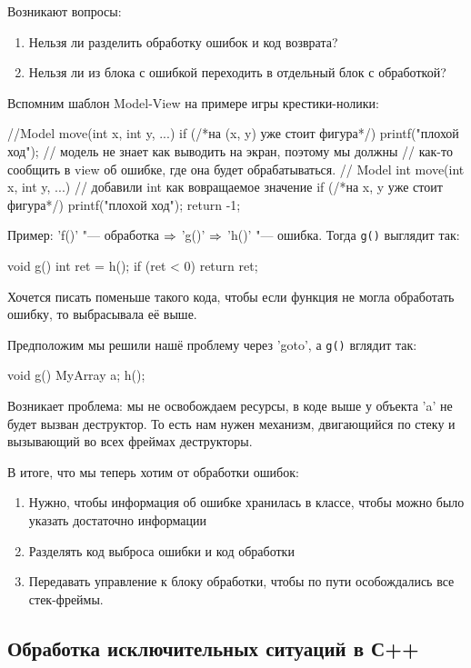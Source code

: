 Возникают вопросы:
\begin{enumerate}
\item Нельзя ли разделить обработку ошибок и код возврата?
\item Нельзя ли из блока с ошибкой переходить в отдельный блок с обработкой?
\end{enumerate}

Вспомним шаблон Model-View на примере игры крестики-нолики:
\begin{cppcode}
//Model
move(int x, int y, ...) {
	if (/*на (x, y) уже стоит фигура*/) {
		printf("плохой ход");
	}
}
// модель не знает как выводить на экран, поэтому мы должны
// как-то сообщить в view об ошибке, где она будет обрабатываться.
// Model
int move(int x, int y, ...) { // добавили int как вовращаемое значение
	if (/*на x, y уже стоит фигура*/) {
		printf("плохой ход");
		return -1;
	}
}
\end{cppcode}

Пример:
\cpp'f()' "--- обработка $\Rightarrow$ \cpp'g()' $\Rightarrow$ \cpp'h()' "--- ошибка.
Тогда \verb'g()' выглядит так:

\begin{cppcode}
void g() {
	int ret = h();
	if (ret < 0)
		return ret;
}
\end{cppcode}
Хочется писать поменьше такого кода, чтобы если функция не могла обработать ошибку, то выбрасывала её выше.

Предположим мы решили нашё проблему через \cpp'goto', а \verb'g()' вглядит так:
\begin{cppcode}
void g() {
	MyArray a;
	h();
}
\end{cppcode}
Возникает проблема: мы не освобождаем ресурсы, в коде выше у объекта \cpp'a' не будет вызван деструктор.
То есть нам нужен механизм, двигающийся по стеку и вызывающий во всех фреймах деструкторы.

В итоге, что мы теперь хотим от обработки ошибок:
\begin{enumerate}
	\item Нужно, чтобы информация об ошибке хранилась в классе, чтобы можно было указать достаточно информации
	\item Разделять код выброса ошибки и код обработки
	\item Передавать управление к блоку обработки, чтобы по пути особождались все стек-фреймы.
\end{enumerate}

\subsection{Обработка исключительных ситуаций в С++}

